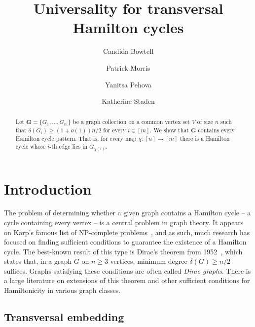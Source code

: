 \documentclass[11pt, dvipsnames]{amsart}
\title{
Universality for transversal Hamilton cycles}
\author{Candida Bowtell}
\author{Patrick Morris}
\author{Yanitsa Pehova}
\author{Katherine Staden}
\theoremstyle{plain}
\theoremstyle{definition}
\newcommand{\dD}{\delta}
\begin{document}
\date{}

\begin{abstract} 
Let $\mathbf{G}=\{G_1, \ldots, G_m\}$ be a graph collection on a common vertex set $V$ of size $n$ such that $\delta(G_i) \geq (1+o(1))n/2$ for every $i \in [m]$. We show that $\mathbf{G}$ contains every Hamilton cycle pattern. That is, for every map $\chi: [n] \to [m]$ there is a Hamilton cycle whose $i$-th edge lies in $G_{\chi(i)}$. 
\end{abstract}

\maketitle

\section{Introduction}

The problem of determining whether a given graph contains a Hamilton cycle -- a cycle containing every vertex -- is a central problem in graph theory. It appears on Karp's famous list of NP-complete problems~\cite{karp}, and as such, much research has focused on finding sufficient conditions to guarantee the existence of a Hamilton cycle.
The best-known result of this type is Dirac's theorem from 1952~\cite{dirac}, which states that, in a graph $G$ on $n\ge 3$ vertices, minimum degree $\dD(G) \geq n/2$ suffices. Graphs satisfying these conditions are often called \emph{Dirac graphs}. There is a large literature on extensions of this theorem and other sufficient conditions for Hamiltonicity in various graph classes.

\subsection{Transversal embedding}
\end{document}
